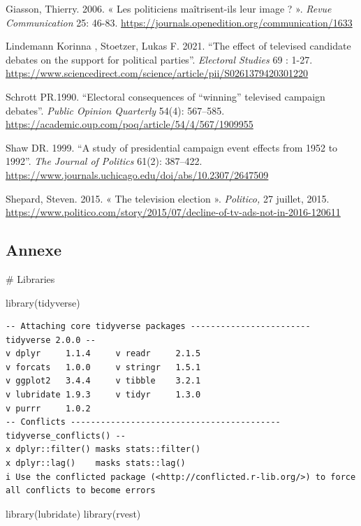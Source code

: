 \documentclass[
  letterpaper,
  DIV=11,
  numbers=noendperiod]{scrartcl}
\newenvironment{Shaded}{\begin{snugshade}}{\end{snugshade}}
\newcommand{\CommentTok}[1]{\textcolor[rgb]{0.37,0.37,0.37}{#1}}
\newcommand{\FunctionTok}[1]{\textcolor[rgb]{0.28,0.35,0.67}{#1}}
\newcommand{\NormalTok}[1]{\textcolor[rgb]{0.00,0.23,0.31}{#1}}
\begin{document}
Giasson, Thierry. 2006. « Les politiciens maîtrisent-ils leur image ? ».
\emph{Revue Communication} 25: 46-83.
\url{https://journals.openedition.org/communication/1633}

Lindemann Korinna , Stoetzer, Lukas F. 2021. ``The effect of televised
candidate debates on the support for political parties''.
\emph{Electoral Studies} 69 : 1-27.
\url{https://www.sciencedirect.com/science/article/pii/S0261379420301220}

Schrott PR.1990. ``Electoral consequences of ``winning'' televised
campaign debates''. \emph{Public Opinion Quarterly} 54(4): 567--585.
\url{https://academic.oup.com/poq/article/54/4/567/1909955}

Shaw DR. 1999. ``A study of presidential campaign event effects from
1952 to 1992''. \emph{The Journal of Politics} 61(2): 387--422.
\url{https://www.journals.uchicago.edu/doi/abs/10.2307/2647509}

Shepard, Steven. 2015. « The television election ». \emph{Politico,} 27
juillet, 2015.
\url{https://www.politico.com/story/2015/07/decline-of-tv-ads-not-in-2016-120611}

\hypertarget{annexe}{%
\subsection{Annexe}\label{annexe}}

\begin{Shaded}
\begin{Highlighting}[]
\CommentTok{\# Libraries}

\FunctionTok{library}\NormalTok{(tidyverse)}
\end{Highlighting}
\end{Shaded}

\begin{verbatim}
-- Attaching core tidyverse packages ------------------------ tidyverse 2.0.0 --
v dplyr     1.1.4     v readr     2.1.5
v forcats   1.0.0     v stringr   1.5.1
v ggplot2   3.4.4     v tibble    3.2.1
v lubridate 1.9.3     v tidyr     1.3.0
v purrr     1.0.2     
-- Conflicts ------------------------------------------ tidyverse_conflicts() --
x dplyr::filter() masks stats::filter()
x dplyr::lag()    masks stats::lag()
i Use the conflicted package (<http://conflicted.r-lib.org/>) to force all conflicts to become errors
\end{verbatim}

\begin{Shaded}
\begin{Highlighting}[]
\FunctionTok{library}\NormalTok{(lubridate)}
\FunctionTok{library}\NormalTok{(rvest)}
\end{Highlighting}
\end{Shaded}
\end{document}
